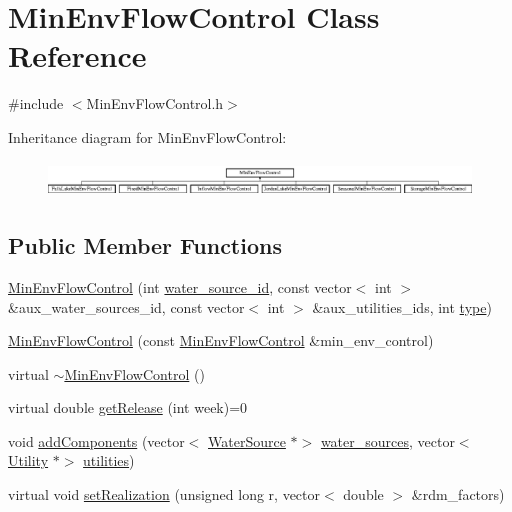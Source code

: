 \hypertarget{classMinEnvFlowControl}{}\section{Min\+Env\+Flow\+Control Class Reference}
\label{classMinEnvFlowControl}


{\ttfamily \#include $<$Min\+Env\+Flow\+Control.\+h$>$}

Inheritance diagram for Min\+Env\+Flow\+Control\+:\begin{figure}[H]
\begin{center}
\leavevmode
\includegraphics[height=0.942761cm]{classMinEnvFlowControl}
\end{center}
\end{figure}
\subsection*{Public Member Functions}
\begin{DoxyCompactItemize}
\item 
\mbox{\hyperlink{classMinEnvFlowControl_a093b292294d85f426c38deb6b7537d81}{Min\+Env\+Flow\+Control}} (int \mbox{\hyperlink{classMinEnvFlowControl_aada518a047598f386daec1d0358023aa}{water\+\_\+source\+\_\+id}}, const vector$<$ int $>$ \&aux\+\_\+water\+\_\+sources\+\_\+id, const vector$<$ int $>$ \&aux\+\_\+utilities\+\_\+ids, int \mbox{\hyperlink{classMinEnvFlowControl_abc3f168cd1ec36ba59e4b8604dfae8ec}{type}})
\item 
\mbox{\hyperlink{classMinEnvFlowControl_a0e12d2b8583a539d200acfc5fac795b6}{Min\+Env\+Flow\+Control}} (const \mbox{\hyperlink{classMinEnvFlowControl}{Min\+Env\+Flow\+Control}} \&min\+\_\+env\+\_\+control)
\item 
virtual \mbox{\hyperlink{classMinEnvFlowControl_a809d1552ea730c607dbc73937eb70a6a}{$\sim$\+Min\+Env\+Flow\+Control}} ()
\item 
virtual double \mbox{\hyperlink{classMinEnvFlowControl_a5de79615852eb0c937dd559a9eb9402d}{get\+Release}} (int week)=0
\item 
void \mbox{\hyperlink{classMinEnvFlowControl_a4f849e1385f68c9d8f2835889f14a71f}{add\+Components}} (vector$<$ \mbox{\hyperlink{classWaterSource}{Water\+Source}} $\ast$$>$ \mbox{\hyperlink{classMinEnvFlowControl_a36b50d0e6887b956051ae53bf5d2e3a9}{water\+\_\+sources}}, vector$<$ \mbox{\hyperlink{classUtility}{Utility}} $\ast$$>$ \mbox{\hyperlink{classMinEnvFlowControl_a1a0a309138b35e8199c205efb5fb5f80}{utilities}})
\item 
virtual void \mbox{\hyperlink{classMinEnvFlowControl_aff9774bd700410f9cd9a04e323f824c8}{set\+Realization}} (unsigned long r, vector$<$ double $>$ \&rdm\+\_\+factors)
\end{DoxyCompactItemize}
